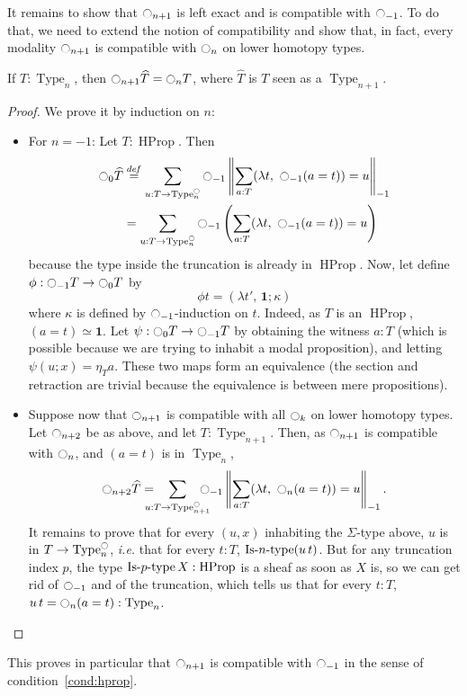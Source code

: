 \documentclass[notfinal]{jfrarticle}
\DeclareMathOperator{\Type}{Type}
\DeclareMathOperator{\HProp}{HProp}
\newcommand \defeq {\overset{de\hspace{-0.2ex}f}{=}}
\def\mymathhyphen{{\hbox{-}}}
\newcommand{\IsType}[1]
{\mathop{\mathrm{Is\mymathhyphen}#1\mathrm{\mymathhyphen type}} }
\newcommand{\modal}{\ensuremath{\ocircle}}
\newcommand \one {\mathbf{1}}
\newcommand{\ie}{\emph{i.e.}}
\begin{document}
It remains to show that $\modal_{n+1}$ is left exact and is compatible
with $\modal_{-1}$. To do that, we need to extend the notion of
compatibility and show that, in fact, every modality $\modal_{n+1}$ is
compatible with $\modal_n$ on lower homotopy types.
\begin{prop} \label{prop:compatibility}
  If $T:\Type_n$, then $\modal_{n+1} \widehat T = \modal_n T$, where $\widehat T$ is $T$ seen as a
  $\Type_{n+1}$.
\end{prop}
\begin{proof}
  We prove it by induction on $n$:
  \begin{itemize}
  \item For $n=-1$: Let $T:\HProp$. Then
    \begin{align*}
      \modal_{0} \widehat T &\defeq \sum_{u:T \to \Type_n^\modal} \modal_{-1}\left\| \sum_{a:T} 
      (\lambda t,~\modal_{-1} (a=t)) = u\right\|_{-1} \\
      &= \sum_{u:T \to \Type_n^\modal} \modal_{-1}\left( \sum_{a:T} 
      (\lambda t,~\modal_{-1} (a=t)) = u\right)
    \end{align*}
    because the type inside the truncation is already in $\HProp$.
    Now, let define $\phi : \modal_{-1} T \to \modal_0T$ by
    \[\phi t = (\lambda t',\, \one
      ;\kappa)\]%
    where $\kappa$ is defined by $\modal_{-1}$-induction on
    $t$. Indeed, as $T$ is an $\HProp$, $(a=t) \simeq \one$. 
    Let $\psi : \modal_0T\to \modal_{-1} T$ by obtaining the
    witness $a:T$ (which is possible because we are trying to inhabit
    a modal proposition), and letting $\psi (u;x) = \eta_T a$.
    These two maps form an equivalence (the section and retraction are
    trivial because the equivalence is between mere propositions).
  \item Suppose now that $\modal_{n+1}$ is compatible with all $\modal_k$ on
    lower homotopy types. Let $\modal_{n+2}$ be as above, and let
    $T:\Type_{n+1}$. Then, as $\modal_{n+1}$ is compatible with $\modal_{n}$, and
    $(a=t)$ is in $\Type_n$,
    \[
      \modal_{n+2} \widehat T= \hspace{-1em} \sum_{u:T \to
        \Type_{n+1}^\modal} 
      \hspace{-1em} \modal_{-1}\left\| \sum_{a:T} 
        (\lambda t,~\modal_{n} (a=t)) = u\right\|_{-1}.
    \]%
    It remains to prove that for every $(u,x)$ inhabiting the
    $\Sigma$-type above, $u$ is in $T\to\Type_n^\modal$, \ie{} that for
    every $t:T$, $\IsType n (u\, t)$.  But for any truncation index
    $p$,
    the type $\IsType p X:\HProp$ is a sheaf as soon as $X$ is, so we can get rid
    of $\modal_{-1}$ and of the truncation, which tells us that for
    every 
    $t:T$, $u\, t = \modal_n(a=t) : \Type_n$. 
  \end{itemize}
\end{proof}
This proves in particular that $\modal_{n+1}$ is compatible with
$\modal_{-1}$ in the sense of condition~\ref{cond:hprop}.
\end{document}

